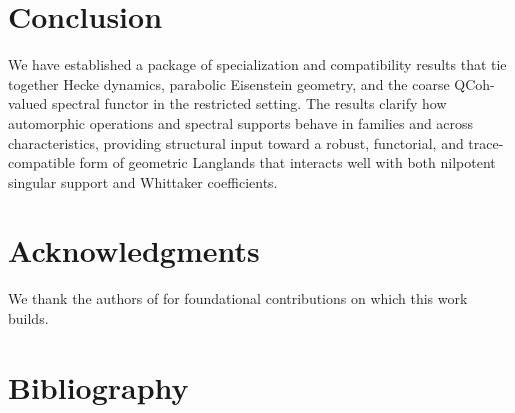 \documentclass[11pt]{article}
\theoremstyle{plain}
\theoremstyle{definition}
\theoremstyle{remark}
\begin{document}
\section{Conclusion}
We have established a package of specialization and compatibility results that tie together Hecke dynamics, parabolic Eisenstein geometry, and the coarse QCoh-valued spectral functor in the restricted setting. The results clarify how automorphic operations and spectral supports behave in families and across characteristics, providing structural input toward a robust, functorial, and trace-compatible form of geometric Langlands that interacts well with both nilpotent singular support and Whittaker coefficients.

\section*{Acknowledgments}
We thank the authors of \cite{ArinkinGaitsgory2015-SingularSupport,AGKRRV2020-RestrictedLocSys,BravermanGaitsgory2002-GeometricEisenstein,BFGM2002-ICDrinfeld,GaitsgoryRaskin2024-GLFunctorI} for foundational contributions on which this work builds.

\section*{Bibliography}

\end{document}
